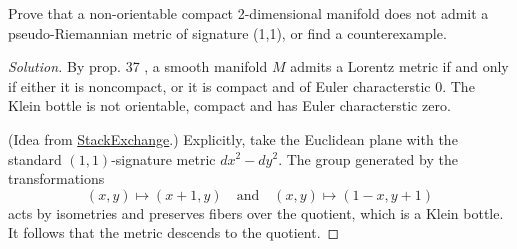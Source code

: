 \documentclass{article}
\begin{document}
\begin{exercise}
	Prove that a non-orientable compact 2-dimensional manifold does not admit a pseudo-Riemannian metric of signature (1,1), or find a counterexample.
\end{exercise}
\begin{proof}[Solution]
	By prop. 37 \cite{oneill}, a smooth manifold $M$ admits a Lorentz metric if and only if either it is noncompact, or it is compact and of Euler characterstic 0. The Klein bottle is not orientable, compact and has Euler characterstic zero.
	
	(Idea from \href{https://math.stackexchange.com/questions/1126822/an-explicit-lorentzian-metric-on-the-klein-bottle}{StackExchange}.) Explicitly, take the Euclidean plane with the standard $(1,1)$-signature metric $dx^2-dy^2$. The group generated by the transformations
	\[(x,y)\mapsto(x+1,y)\quad\text{and}\quad(x,y)\mapsto(1-x,y+1)\]
	acts by isometries and preserves fibers over the quotient, which is a Klein bottle. It follows that the metric descends to the quotient.
\end{proof}

\printbibliography
\end{document}
